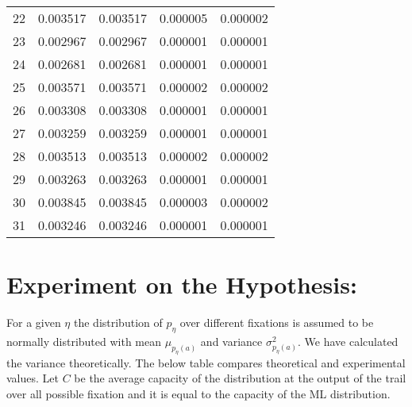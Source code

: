 \documentclass[9pt]{article}
\begin{document}
\begin{tabular}{l*{3}{c}r}
22 & 0.003517 & 0.003517 & 0.000005 & 0.000002 \\
23 & 0.002967 & 0.002967 & 0.000001 & 0.000001 \\
24 & 0.002681 & 0.002681 & 0.000001 & 0.000001 \\
25 & 0.003571 & 0.003571 & 0.000002 & 0.000002 \\
26 & 0.003308 & 0.003308 & 0.000001 & 0.000001 \\
27 & 0.003259 & 0.003259 & 0.000001 & 0.000001 \\
28 & 0.003513 & 0.003513 & 0.000002 & 0.000002 \\
29 & 0.003263 & 0.003263 & 0.000001 & 0.000001 \\
30 & 0.003845 & 0.003845 & 0.000003 & 0.000002 \\
31 & 0.003246 & 0.003246 & 0.000001 & 0.000001 \\
\end{tabular}


\section{Experiment on the Hypothesis:} 
For a given $\eta$ the distribution of $p_{\eta}$ over different fixations is assumed to be normally distributed with mean $\mu_{p_{\eta}(a)}$ and variance $\sigma^2_{p_{\eta}(a)}$. We have calculated the variance theoretically. The below table compares theoretical and experimental values. Let $C$ be the average capacity of the distribution at the output of the trail over all possible fixation and it is equal to the capacity of the ML distribution.
\end{document}
